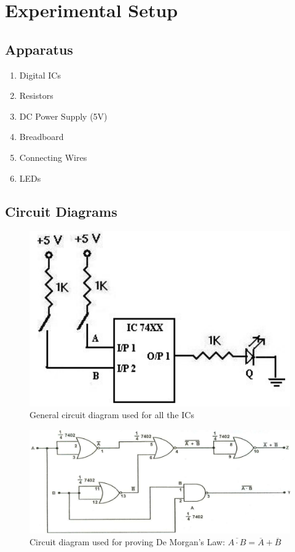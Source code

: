 \section{Experimental Setup}

\subsection*{Apparatus}

\begin{enumerate}
    \item Digital ICs
    \item Resistors
    \item DC Power Supply (5V)
    \item Breadboard
    \item Connecting Wires
    \item LEDs
\end{enumerate}

\subsection*{Circuit Diagrams}

\begin{figure}[H]
    \centering
    \includegraphics[width=0.60\columnwidth]{images/gen.png}
    \caption{General circuit diagram used for all the ICs}
    \label{gen}
\end{figure}

\begin{figure}[H]
    \centering
    \includegraphics[width=1\columnwidth]{images/and_neg.png}
    \caption{Circuit diagram used for proving De Morgan's Law: ${\overline{A\cdot B} = \overline{A} + \overline {B}}$}
    \label{and_neg}
\end{figure}

